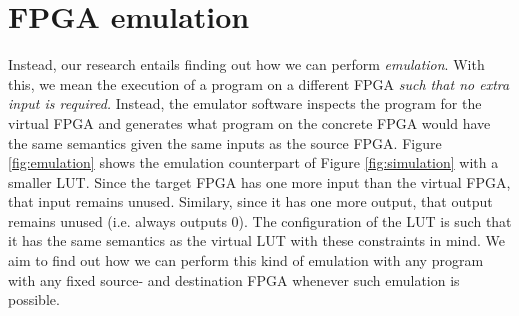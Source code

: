 \section{FPGA emulation}
Instead, our research entails finding out how we can perform \textit{emulation}. With this, we mean the execution of a program on a different FPGA \textit{such that no extra input is required.} Instead, the emulator software inspects the program for the virtual FPGA and generates what program on the concrete FPGA would have the same semantics given the same inputs as the source FPGA. Figure \ref{fig:emulation} shows the emulation counterpart of Figure \ref{fig:simulation} with a smaller LUT. Since the target FPGA has one more input than the virtual FPGA, that input remains unused. Similary, since it has one more output, that output remains unused (i.e. always outputs 0). The configuration of the LUT is such that it has the same semantics as the virtual LUT with these constraints in mind. We aim to find out how we can perform this kind of emulation with any program with any fixed source- and destination FPGA whenever such emulation is possible.
